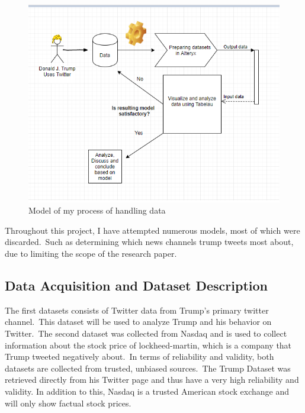 \documentclass[12pt]{article}
\begin{document}
\begin{figure}[H] %
	\centering %
\includegraphics [scale= .85]  {SygModel.PNG}    %
	\caption[Optional caption] {Model of my process of handling data}
	\label{fig:wordcloudBliz}

\end{figure}


Throughout this project, I have attempted numerous models, most of which were discarded.\ Such as determining which news channels trump tweets most about, due to limiting the scope of the research paper.

\subsection{Data Acquisition and Dataset Description}
The first datasets consists of Twitter data from Trump's primary twitter channel.\  This dataset will be used to analyze Trump and his behavior on Twitter.\ The second dataset was collected from Nasdaq and is used to collect information about the stock price of lockheed-martin, which is a company that Trump tweeted negatively about.\ In terms of reliability and validity, both datasets are collected from trusted, unbiased sources.\ The Trump Dataset was retrieved directly from his Twitter page and thus have a very high reliability and validity. In addition to this, Nasdaq is a trusted American stock exchange and will only show factual stock prices. \citep{lockheed}
\end{document}
